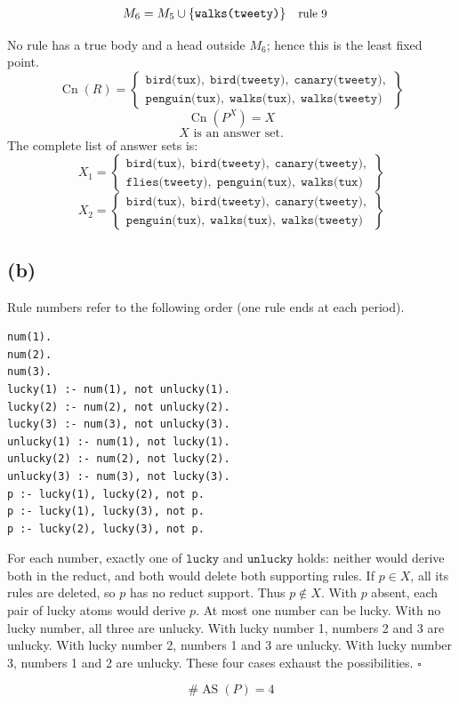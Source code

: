 \documentclass[a4paper,11pt]{article}
\newif\ifexplain
\newcommand{\explain}[1]{\ifexplain\begin{erklbox}#1\end{erklbox}\fi}
\newcommand{\why}[1]{\text{\small #1}}
\newcommand{\teil}[1]{\subsection*{(#1)}}
\newcommand{\at}[1]{\texttt{#1}}
\begin{document}
\begin{align*}
M_{6} &= M_{5}\cup \{\at{walks(tweety)}\} && \why{rule 9}
\end{align*}
\explain{Für $\at{walks(tweety)}$ brauchen wir $\at{bird(tweety)}$. Weil diese Voraussetzungen bereits hergeleitet sind, dürfen wir den Regelkopf jetzt aufnehmen und alle bisherigen Atome behalten; bei einer fehlenden Voraussetzung würde diese Regel dagegen noch nichts beitragen.}
No rule has a true body and a head outside $M_{6}$; hence this is the least fixed point.
\[
\operatorname{Cn}(R)=\left\{\begin{gathered}\at{bird(tux)},\;\at{bird(tweety)},\;\at{canary(tweety)},\\\at{penguin(tux)},\;\at{walks(tux)},\;\at{walks(tweety)}\end{gathered}\right\}
\]
\[
\operatorname{Cn}(P^X)=X
\]
\[
\boxed{X\text{ is an answer set.}}
\]
The complete list of answer sets is:
\[
\boxed{X_1=\left\{\begin{gathered}\at{bird(tux)},\;\at{bird(tweety)},\;\at{canary(tweety)},\\\at{flies(tweety)},\;\at{penguin(tux)},\;\at{walks(tux)}\end{gathered}\right\}}
\]
\[
\boxed{X_2=\left\{\begin{gathered}\at{bird(tux)},\;\at{bird(tweety)},\;\at{canary(tweety)},\\\at{penguin(tux)},\;\at{walks(tux)},\;\at{walks(tweety)}\end{gathered}\right\}}
\]
\teil{b}
Rule numbers refer to the following order (one rule ends at each period).
\begin{small}
\begin{verbatim}
num(1).
num(2).
num(3).
lucky(1) :- num(1), not unlucky(1).
lucky(2) :- num(2), not unlucky(2).
lucky(3) :- num(3), not unlucky(3).
unlucky(1) :- num(1), not lucky(1).
unlucky(2) :- num(2), not lucky(2).
unlucky(3) :- num(3), not lucky(3).
p :- lucky(1), lucky(2), not p.
p :- lucky(1), lucky(3), not p.
p :- lucky(2), lucky(3), not p.
\end{verbatim}
\end{small}
For each number, exactly one of $\at{lucky}$ and $\at{unlucky}$ holds: neither would derive both in the reduct, and both would delete both supporting rules. If $p\in X$, all its rules are deleted, so $p$ has no reduct support. Thus $p\notin X$. With $p$ absent, each pair of lucky atoms would derive $p$. At most one number can be lucky. With no lucky number, all three are unlucky. With lucky number 1, numbers 2 and 3 are unlucky. With lucky number 2, numbers 1 and 3 are unlucky. With lucky number 3, numbers 1 and 2 are unlucky. These four cases exhaust the possibilities. $\square$
\explain{Zuerst klären wir, welche Kombinationen überhaupt möglich sind. Gegenseitige Default-Negation lässt genau eine der beiden Eigenschaften zu. Eine Regel mit \texttt{not p} und Kopf $p$ kann einen Fall ausschließen, statt einfach $p$ zu einer stabilen Lösung hinzuzufügen. Die Redukt-Proben darunter prüfen jede verbliebene Kombination einzeln.}
\[
\boxed{\#\operatorname{AS}(P)=4}
\]
\end{document}
